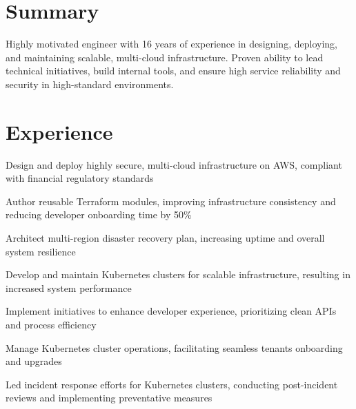 \documentclass[]{willianpaixao-resume}
\begin{document}
\begin{minipage}[t]{0.64\textwidth}

\section{Summary}
Highly motivated engineer with 16 years of experience in designing, deploying, and maintaining scalable, multi-cloud infrastructure. Proven ability to lead technical initiatives, build internal tools, and ensure high service reliability and security in high-standard environments.
\section{Experience}
\sectionsep
\begin{tightemize}
\item Design and deploy highly secure, multi-cloud infrastructure on AWS, compliant with financial regulatory standards
\item Author reusable Terraform modules, improving infrastructure consistency and reducing developer onboarding time by 50\%
\end{tightemize}
\sectionsep
{}
\begin{tightemize}
\item Architect multi-region disaster recovery plan, increasing uptime and overall system resilience
\item Develop and maintain Kubernetes clusters for scalable infrastructure, resulting in increased system performance
\end{tightemize}
\sectionsep

\begin{tightemize}
\item Implement initiatives to enhance developer experience, prioritizing clean APIs and process efficiency
\item Manage Kubernetes cluster operations, facilitating seamless tenants onboarding and upgrades
\item Led incident response efforts for Kubernetes clusters, conducting post-incident reviews and implementing preventative measures
\end{tightemize}
\sectionsep


\end{minipage}
\end{document}
